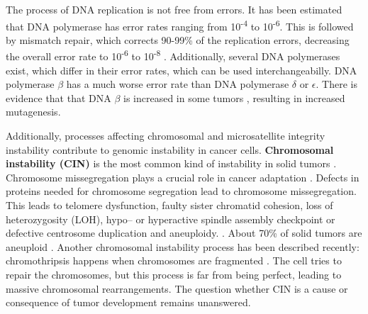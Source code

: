      The process of DNA replication is not free from errors. It has been
      estimated that DNA polymerase has error rates ranging from
      10\textsuperscript{-4} to 10\textsuperscript{-6}. This is followed by
      mismatch repair, which corrects 90-99\% of the replication errors,
      decreasing the overall error rate to 10\textsuperscript{-6} to
      10\textsuperscript{-8} {\cite{multiple_mutations}}. Additionally, several
      DNA polymerases exist, which differ in their error rates, which can be
      used interchangeabilly. DNA polymerase $\beta$ has a much worse error rate
      than DNA polymerase $\delta$ or $\epsilon$. There is evidence that that
      DNA $\beta$ is increased in some tumors {\cite{dna_pol}}, resulting in
      increased mutagenesis.

      Additionally, processes affecting chromosomal and microsatellite integrity
      instability contribute to genomic instability in cancer cells.
      \textbf{Chromosomal instability (CIN)} is the most common kind of
      instability in solid tumors {\cite{cin_crc}}. Chromosome missegregation
      plays a crucial role in cancer adaptation
      {\cite{chromosome_missegregation}}. Defects in proteins needed for
      chromosome segregation lead to chromosome missegregation. This leads to
      telomere dysfunction,  faulty sister chromatid cohesion, loss of
      heterozygosity (LOH), hypo-- or hyperactive spindle assembly checkpoint or
      defective centrosome duplication and aneuploidy. {\cite{cin_crc}}. About
      70\% of solid tumors are aneuploid {\cite{aneuploidy}}. Another
      chromosomal instability process has been described recently:
      chromothripsis happens when chromosomes are fragmented
      {\cite{chromothripsis_1}} {\cite{chromothripsis_2}}
      {\cite{chromothripsis_2}}. The cell tries to repair the chromosomes, but
      this process is far from being perfect, leading to massive chromosomal
      rearrangements. The question whether CIN is a cause or consequence of
      tumor development remains unanswered.

